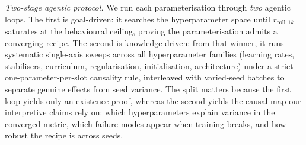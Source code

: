 \documentclass[11pt]{article}
\begin{document}
\medskip
\noindent\emph{Two-stage agentic protocol.} We run each parameterisation through \emph{two} agentic loops. The first is goal-driven: it searches the hyperparameter space until $r_{\mathrm{roll},1k}$ saturates at the behavioural ceiling, proving the parameterisation admits a converging recipe. The second is knowledge-driven: from that winner, it runs systematic single-axis sweeps across all hyperparameter families (learning rates, stabilisers, curriculum, regularisation, initialisation, architecture) under a strict one-parameter-per-slot causality rule, interleaved with varied-seed batches to separate genuine effects from seed variance. The split matters because the first loop yields only an existence proof, whereas the second yields the causal map our interpretive claims rely on: which hyperparameters explain variance in the converged metric, which failure modes appear when training breaks, and how robust the recipe is across seeds.
\end{document}
